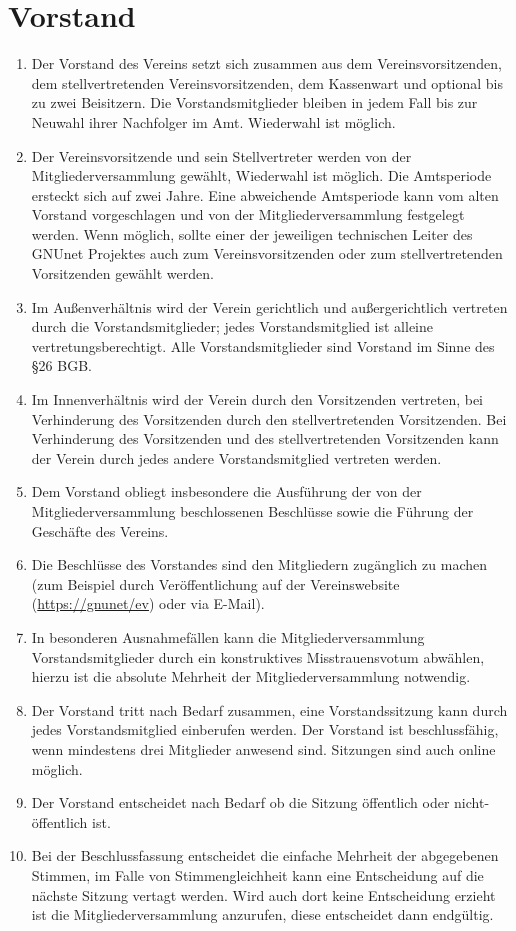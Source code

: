 \documentclass[german,a4paper]{article} %
\newenvironment{enumpar}{%
  \renewcommand{\labelenumi}{\theenumi}%
  \renewcommand{\theenumi}{(\arabic{enumi})}%
  \renewcommand{\labelenumii}{\theenumii}%
  \renewcommand{\theenumii}{(\alph{enumii})}%
  \begin{enumerate}}
{\end{enumerate}}
\begin{document}
\section{Vorstand}
\label{Vorstand}
\begin{enumpar}
\item \label{vorstandsämter} Der Vorstand des Vereins setzt sich zusammen aus dem Vereinsvorsitzenden, dem stellvertretenden Vereinsvorsitzenden, dem Kassenwart und optional bis zu zwei Beisitzern. Die Vorstandsmitglieder bleiben in jedem Fall bis zur Neuwahl ihrer Nachfolger im Amt. Wiederwahl ist möglich.
\item Der Vereinsvorsitzende und sein Stellvertreter werden von der Mitgliederversammlung gewählt, Wiederwahl ist möglich. Die Amtsperiode ersteckt sich auf zwei Jahre. Eine abweichende Amtsperiode kann vom alten Vorstand vorgeschlagen und von der Mitgliederversammlung festgelegt werden. Wenn möglich, sollte einer der jeweiligen technischen Leiter des GNUnet Projektes auch zum Vereinsvorsitzenden oder zum stellvertretenden Vorsitzenden gewählt werden.
\item Im Außenverhältnis wird der Verein gerichtlich und außergerichtlich vertreten durch die Vorstandsmitglieder; jedes Vorstandsmitglied ist alleine vertretungsberechtigt. Alle Vorstandsmitglieder sind Vorstand im Sinne des \S26 BGB.\par
\item Im Innenverhältnis wird der Verein durch den Vorsitzenden vertreten, bei Verhinderung des Vorsitzenden durch den stellvertretenden Vorsitzenden. Bei Verhinderung des Vorsitzenden und des stellvertretenden Vorsitzenden kann der Verein durch jedes andere Vorstandsmitglied vertreten werden.
\item Dem Vorstand obliegt insbesondere die Ausführung der von der Mitgliederversammlung beschlossenen Beschlüsse sowie die Führung der Geschäfte des Vereins.
\item Die Beschlüsse des Vorstandes sind den Mitgliedern zugänglich zu machen (zum Beispiel durch Ver\"offentlichung auf der Vereinswebsite (\url{https://gnunet/ev}) oder via E-Mail).
\item In besonderen Ausnahmefällen kann die Mitgliederversammlung Vorstandsmitglieder durch ein konstruktives Misstrauensvotum abwählen, hierzu ist die absolute Mehrheit der Mitgliederversammlung notwendig.
\item Der Vorstand tritt nach Bedarf zusammen, eine Vorstandssitzung kann durch jedes Vorstandsmitglied einberufen werden. Der Vorstand ist beschlussfähig, wenn mindestens drei Mitglieder anwesend sind. Sitzungen sind auch online m\"oglich.
\item Der Vorstand entscheidet nach Bedarf ob die Sitzung \"offentlich oder nicht-\"offentlich ist.
\item Bei der Beschlussfassung entscheidet die einfache Mehrheit der abgegebenen Stimmen, im Falle von Stimmengleichheit kann eine Entscheidung auf die nächste Sitzung vertagt werden. Wird auch dort keine Entscheidung erzieht ist die Mitgliederversammlung anzurufen, diese entscheidet dann endgültig.
\end{enumpar}
\end{document}
